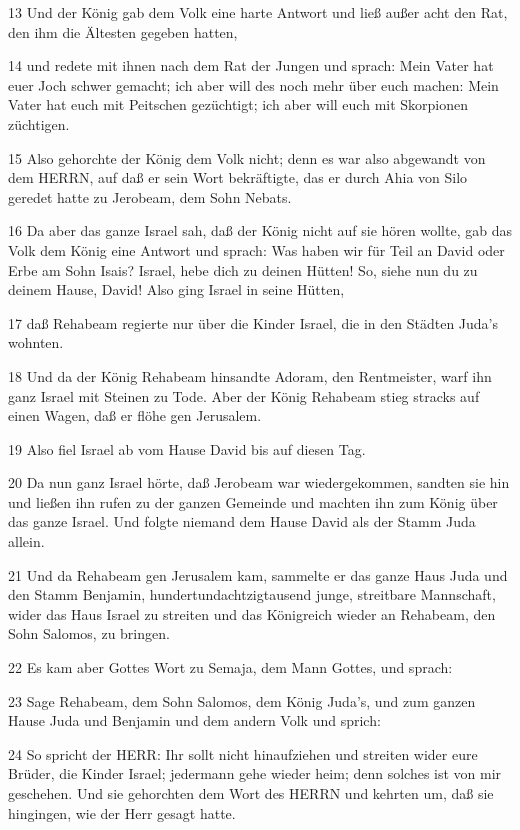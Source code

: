 \par 13 Und der König gab dem Volk eine harte Antwort und ließ außer acht den Rat, den ihm die Ältesten gegeben hatten,
\par 14 und redete mit ihnen nach dem Rat der Jungen und sprach: Mein Vater hat euer Joch schwer gemacht; ich aber will des noch mehr über euch machen: Mein Vater hat euch mit Peitschen gezüchtigt; ich aber will euch mit Skorpionen züchtigen.
\par 15 Also gehorchte der König dem Volk nicht; denn es war also abgewandt von dem HERRN, auf daß er sein Wort bekräftigte, das er durch Ahia von Silo geredet hatte zu Jerobeam, dem Sohn Nebats.
\par 16 Da aber das ganze Israel sah, daß der König nicht auf sie hören wollte, gab das Volk dem König eine Antwort und sprach: Was haben wir für Teil an David oder Erbe am Sohn Isais? Israel, hebe dich zu deinen Hütten! So, siehe nun du zu deinem Hause, David! Also ging Israel in seine Hütten,
\par 17 daß Rehabeam regierte nur über die Kinder Israel, die in den Städten Juda's wohnten.
\par 18 Und da der König Rehabeam hinsandte Adoram, den Rentmeister, warf ihn ganz Israel mit Steinen zu Tode. Aber der König Rehabeam stieg stracks auf einen Wagen, daß er flöhe gen Jerusalem.
\par 19 Also fiel Israel ab vom Hause David bis auf diesen Tag.
\par 20 Da nun ganz Israel hörte, daß Jerobeam war wiedergekommen, sandten sie hin und ließen ihn rufen zu der ganzen Gemeinde und machten ihn zum König über das ganze Israel. Und folgte niemand dem Hause David als der Stamm Juda allein.
\par 21 Und da Rehabeam gen Jerusalem kam, sammelte er das ganze Haus Juda und den Stamm Benjamin, hundertundachtzigtausend junge, streitbare Mannschaft, wider das Haus Israel zu streiten und das Königreich wieder an Rehabeam, den Sohn Salomos, zu bringen.
\par 22 Es kam aber Gottes Wort zu Semaja, dem Mann Gottes, und sprach:
\par 23 Sage Rehabeam, dem Sohn Salomos, dem König Juda's, und zum ganzen Hause Juda und Benjamin und dem andern Volk und sprich:
\par 24 So spricht der HERR: Ihr sollt nicht hinaufziehen und streiten wider eure Brüder, die Kinder Israel; jedermann gehe wieder heim; denn solches ist von mir geschehen. Und sie gehorchten dem Wort des HERRN und kehrten um, daß sie hingingen, wie der Herr gesagt hatte.
